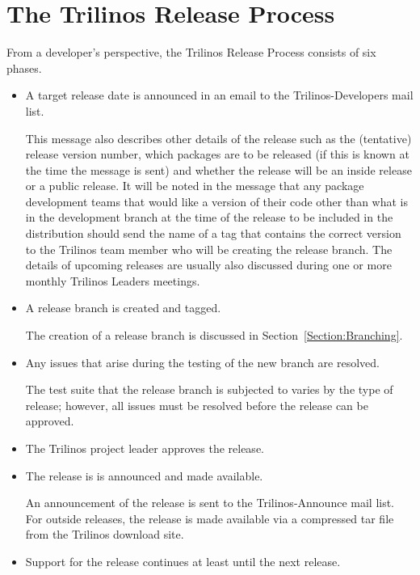 \documentclass[12pt,relax]{TrilinosDevGuide}
\begin{document}
\section{The Trilinos Release Process}
\label{Section:ReleaseProcess}

From a developer's perspective, the Trilinos Release Process consists 
of six phases.

\begin{itemize}
\item A target release date is announced in an email to the 
Trilinos-Developers mail list.

This message also describes other details of the release such as 
the (tentative) release version number, which packages are to be 
released (if this is known at the time the message is sent) and 
whether the release will be an inside release or a public release.  
It will be noted in the message that any package development teams 
that would like a version of their code other than what is in the 
development branch at the time of the release to be included in the 
distribution should send the name of a tag that contains the correct 
version to the Trilinos team member who will be 
creating the release branch.  The details of upcoming releases are usually
also discussed during one or more monthly Trilinos Leaders meetings.

\item A release branch is created and tagged.

The creation of a release branch is discussed in 
Section~\ref{Section:Branching}.

\item Any issues that arise during the testing of the new branch are 
resolved.

The test suite that the release branch is subjected to varies by 
the type of release; however, all issues must be resolved before the 
release can be approved.

\item The Trilinos project leader approves the release.

\item The release is is announced and made available.

An announcement of the release is sent to the Trilinos-Announce 
mail list.  For outside releases, the release is made available 
via a compressed tar file from the Trilinos download site.

\item Support for the release continues at least until the next 
release.

\end{itemize}
\end{document}
